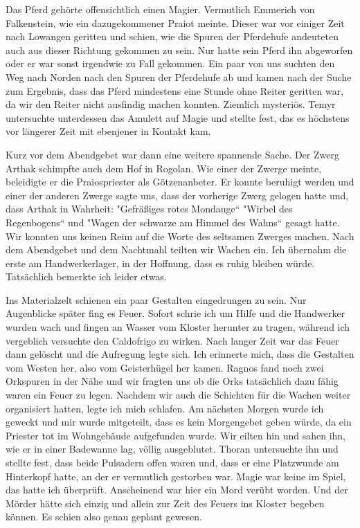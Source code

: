 \documentclass[11pt]{scrreprt}
\begin{document}
Das Pferd gehörte offensichtlich einen Magier. Vermutlich Emmerich von Falkenstein, wie ein dazugekommener Praiot meinte. Dieser war vor einiger Zeit nach Lowangen geritten und schien, wie die Spuren der Pferdehufe andeuteten auch aus dieser Richtung gekommen zu sein. Nur hatte sein Pferd ihn abgeworfen oder er war sonst irgendwie zu Fall gekommen. Ein paar von uns suchten den Weg nach Norden nach den Spuren der Pferdehufe ab und kamen nach der Suche zum Ergebnis, dass das Pferd mindestens eine Stunde ohne Reiter geritten war, da wir den Reiter nicht ausfindig machen konnten. Ziemlich mysteriös. Temyr untersuchte unterdessen das Amulett auf Magie und stellte fest, das es höchstens vor längerer Zeit mit ebenjener in Kontakt kam.\par

Kurz vor dem Abendgebet war dann eine weitere spannende Sache. Der Zwerg Arthak schimpfte auch dem Hof in Rogolan. Wie einer der Zwerge meinte, beleidigte er die Praiospriester als Götzenanbeter. Er konnte beruhigt werden und einer der anderen Zwerge sagte uns, dass der vorherige Zwerg gelogen hatte und, dass Arthak in Wahrheit: "Gefräßiges rotes Mondauge“ "Wirbel des Regenbogens“ und "Wagen der schwarze am Himmel des Wahns“ gesagt hatte. Wir konnten uns keinen Reim auf die Worte des seltsamen Zwerges machen. Nach dem Abendgebet und dem Nachtmahl teilten wir Wachen ein. Ich übernahm die erste am Handwerkerlager, in der Hoffnung, dass es ruhig bleiben würde. Tatsächlich bemerkte ich leider etwas.\par

Ins Materialzelt schienen ein paar Gestalten eingedrungen zu sein. Nur Augenblicke später fing es Feuer. Sofort schrie ich um Hilfe und die Handwerker wurden wach und fingen an Wasser vom Kloster herunter zu tragen, während ich vergeblich versuchte den Caldofrigo zu wirken. Nach langer Zeit war das Feuer dann gelöscht und die Aufregung legte sich. Ich erinnerte mich, dass die Gestalten vom Westen her, also vom Geisterhügel her kamen. Ragnos fand noch zwei Orkspuren in der Nähe und wir fragten uns ob die Orks tatsächlich dazu fähig waren ein Feuer zu legen. Nachdem wir auch die Schichten für die Wachen weiter organisiert hatten, legte ich mich schlafen. Am nächsten Morgen wurde ich geweckt und mir wurde mitgeteilt, dass es kein Morgengebet geben würde, da ein Priester tot im Wohngebäude aufgefunden wurde. Wir eilten hin und sahen ihn, wie er in einer Badewanne lag, völlig ausgeblutet. Thoran untersuchte ihn und stellte fest, dass beide Pulsadern offen waren und, dass er eine Platzwunde am Hinterkopf hatte, an der er vermutlich gestorben war. Magie war keine im Spiel, das hatte ich überprüft. Anscheinend war hier ein Mord verübt worden. Und der Mörder hätte sich einzig und allein zur Zeit des Feuers ins Kloster begeben können. Es schien also genau geplant gewesen. \par
\end{document}
